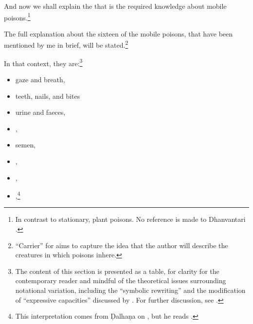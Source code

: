 \begin{translation}
  
  \item[1] 
  
And now we shall explain the  that is the required
knowledge about mobile poisons.\footnote{In contrast to stationary,
    plant poisons.  No reference is made to Dhanvantari
    \citep[see][]{birc-2021}.}

  \item[3] 
  
The full explanation about the sixteen  of
the mobile poisons, that have been mentioned by me in brief, will be
stated.\footnote{“Carrier” for  aims
    to capture the idea that the author will describe the creatures in
    which poisons inhere.}
  
\item[4] 

In that context, they are:\footnote{The content of this section is
    presented as a table, for clarity for the contemporary reader and
    mindful of the theoretical issues surrounding notational variation,
    including the “symbolic rewriting” and the modification of “expressive
    capacities” discussed by \citet[321\,ff]{saru-2016}.  For further
    discussion, see \cite[81--83]{wuja-2021}.}
  \begin{multicols}{2}
      
  \begin{itemize} 
      
      \item gaze and breath, 
      
      \item teeth, nails, and bites 
      
      \item urine and faeces,

\item {}, 

\item semen,

\item {},
  
 
 \item {}, 
\item
 ,\footnote{This interpretation  comes from Ḍalhaṇa on 
 , but he reads .}
 

\end{itemize}
\end{multicols}
\end{translation}
